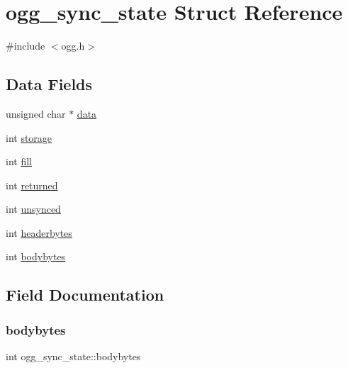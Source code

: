 \hypertarget{structogg__sync__state}{}\section{ogg\+\_\+sync\+\_\+state Struct Reference}
\label{structogg__sync__state}


{\ttfamily \#include $<$ogg.\+h$>$}

\subsection*{Data Fields}
\begin{DoxyCompactItemize}
\item 
unsigned char $\ast$ \hyperlink{structogg__sync__state_adfc3f5d5a6434a582205ece0327fcc7d}{data}
\item 
int \hyperlink{structogg__sync__state_a15fc1bb5161fc4ae87b7a65982776c24}{storage}
\item 
int \hyperlink{structogg__sync__state_a3afef65cd358eab5827304b8c2360c7f}{fill}
\item 
int \hyperlink{structogg__sync__state_ac1b56ee81f71737f2f6397907f55a2e9}{returned}
\item 
int \hyperlink{structogg__sync__state_a8d538bb32400470f00080e2160158a76}{unsynced}
\item 
int \hyperlink{structogg__sync__state_abb64d78f386bc413527df838f2f681d5}{headerbytes}
\item 
int \hyperlink{structogg__sync__state_aa7ea6e81b751baaa04e4b49cb04e8317}{bodybytes}
\end{DoxyCompactItemize}


\subsection{Field Documentation}
\mbox{\label{structogg__sync__state_aa7ea6e81b751baaa04e4b49cb04e8317}} 
\subsubsection{\texorpdfstring{bodybytes}{bodybytes}}
{\footnotesize\ttfamily int ogg\+\_\+sync\+\_\+state\+::bodybytes}

\mbox{\label{structogg__sync__state_adfc3f5d5a6434a582205ece0327fcc7d}} 
